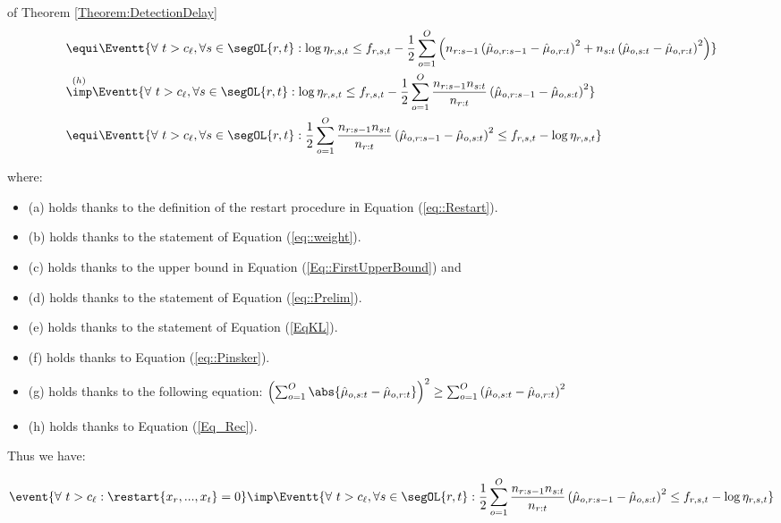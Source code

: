 \documentclass{article} %
\begin{document}
\begin{myproof}{of Theorem \ref{Theorem:DetectionDelay}}
\begin{align*}
& \equi \Eventt{ \forall\  t > c_\ell , \forall  s \in \segOL{r,t}: \log \eta_{r,s,t} \leq  f_{r,s,t} - 
		\frac{1}{2}  \sum_{o=1}^{O} \left( n_{r:s-1} \left(\hat{\mu}_{o,r:s-1} - \hat{\mu}_{o,r:t}\right)^2  
     +n_{s:t} \left(\hat{\mu}_{o,s:t} - \hat{\mu}_{o,r:t}\right)^2 \right)  }
     \\
& \overset{(h)}{\imp} \Eventt{ \forall\  t > c_\ell , \forall  s \in \segOL{r,t}: \log \eta_{r,s,t} \leq  f_{r,s,t} - 
		\frac{1}{2}  \sum_{o=1}^{O} \frac{n_{r:s-1}n_{s:t}}{n_{r:t}} \left( \hat{\mu}_{o,r:s-1} -\hat{\mu}_{o,s:t} \right)^2  }
  \\
& \equi \Eventt{ \forall\  t > c_\ell , \forall  s \in \segOL{r,t}: \frac{1}{2}  \sum_{o=1}^{O} \frac{n_{r:s-1}n_{s:t}}{n_{r:t}} \left( \hat{\mu}_{o,r:s-1} -\hat{\mu}_{o,s:t} \right)^2  \leq  f_{r,s,t} - \log \eta_{r,s,t} }
  \end{align*}



where:
\begin{itemize}
\setlength\itemsep{0.1em}
    \item (a) holds thanks to the definition of the restart procedure in Equation (\ref{eq::Restart}).
    \item (b) holds thanks to the statement of Equation (\ref{eq::weight}).
    \item (c) holds thanks to the upper bound in Equation (\ref{Eq::FirstUpperBound}) and 
    \item (d) holds thanks to the statement of Equation (\ref{eq::Prelim}).
    \item (e) holds thanks to the statement of Equation (\ref{EqKL}).
    \item (f) holds thanks to Equation (\ref{eq::Pinsker}).
    \item (g) holds thanks to the following equation: $    \left( \sum_{o=1}^{O} \abs{\hat{\mu}_{o,s:t} - \hat{\mu}_{o,r:t}} \right)^2 \geq  \sum_{o=1}^{O} \left(\hat{\mu}_{o,s:t} - \hat{\mu}_{o,r:t} \right)^2$
    \item (h) holds thanks to Equation (\ref{Eq_Rec}).
\end{itemize}  

Thus we have:

\begin{align}
    \event{ \forall\  t > c_\ell: \restart{x_r,...,x_t} = 0} \imp \Eventt{ \forall\  t > c_\ell , \forall  s \in \segOL{r,t}: \frac{1}{2}  \sum_{o=1}^{O} \frac{n_{r:s-1}n_{s:t}}{n_{r:t}} \left( \hat{\mu}_{o,r:s-1} -\hat{\mu}_{o,s:t} \right)^2  \leq  f_{r,s,t} - \log \eta_{r,s,t} }
    \label{Eq::Implication}
\end{align}



\end{myproof}
\end{document}
